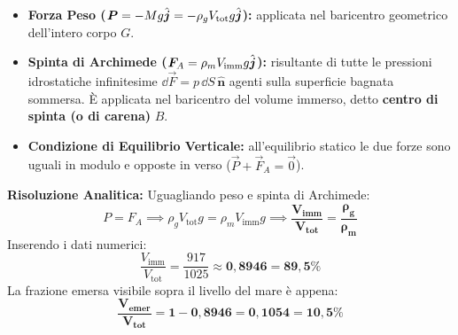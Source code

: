 \begin{tcolorbox}[enhanced, breakable, colback=forestgreen!5!white, colframe=forestgreen!80!black,
    title={\textbf{Analisi delle Forze Idrostatiche e Punti di Applicazione}}, fonttitle=\bfseries\sffamily]
\begin{itemize}
    \item \textbf{Forza Peso ($\bm{P} = -M g\hat{\bm{j}} = -\rho_g V_{\text{tot}} g\hat{\bm{j}}$):} applicata nel baricentro geometrico dell'intero corpo $G$.
    \item \textbf{Spinta di Archimede ($\bm{F}_A = \rho_m V_{\text{imm}} g\hat{\bm{j}}$):} risultante di tutte le pressioni idrostatiche infinitesime $\dd\vec{F} = p\,\dd S\,\hat{\bm{n}}$ agenti sulla superficie bagnata sommersa. È applicata nel baricentro del volume immerso, detto \textbf{centro di spinta (o di carena)} $B$.
    \item \textbf{Condizione di Equilibrio Verticale:} all'equilibrio statico le due forze sono uguali in modulo e opposte in verso ($\vec{P} + \vec{F}_A = \vec{0}$).
\end{itemize}
\end{tcolorbox}

\textbf{Risoluzione Analitica:}
Uguagliando peso e spinta di Archimede:
\begin{equation}
    P = F_A \implies \rho_g V_{\text{tot}} g = \rho_m V_{\text{imm}} g \implies \mathbf{\frac{V_{\text{imm}}}{V_{\text{tot}}} = \frac{\rho_g}{\rho_m}}
\end{equation}
Inserendo i dati numerici:
\begin{equation}
    \frac{V_{\text{imm}}}{V_{\text{tot}}} = \frac{917}{1025} \approx \mathbf{0{,}8946 = 89{,}5\%}
\end{equation}
La frazione emersa visibile sopra il livello del mare è appena:
\begin{equation}
    \mathbf{\frac{V_{\text{emer}}}{V_{\text{tot}}} = 1 - 0{,}8946 = 0{,}1054 = 10{,}5\%}
\end{equation}
